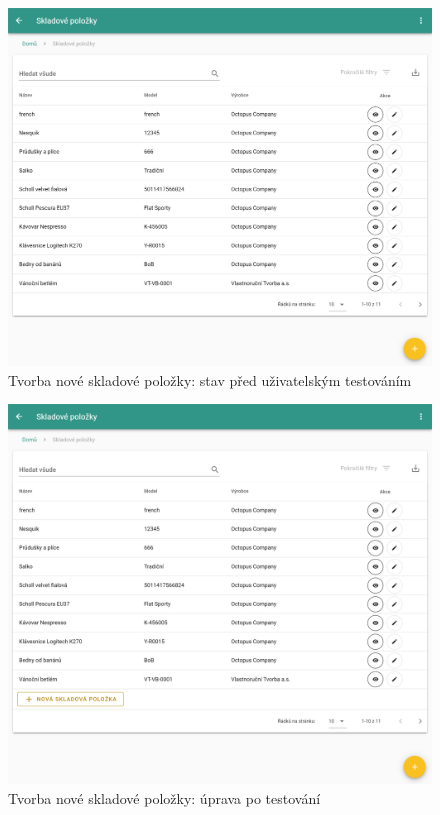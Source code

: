 \begin{figure}[h]
\includegraphics[width=\textwidth]{../png/app_testing/plus_before.png}
\caption{Tvorba nové skladové položky: stav před uživatelským testováním} \label{picture:test:add_before}
\end{figure}

\begin{figure}[h]
\includegraphics[width=\textwidth]{../png/app_testing/plus_after.png}
\caption{Tvorba nové skladové položky: úprava po testování} \label{picture:test:add_after}
\end{figure}


